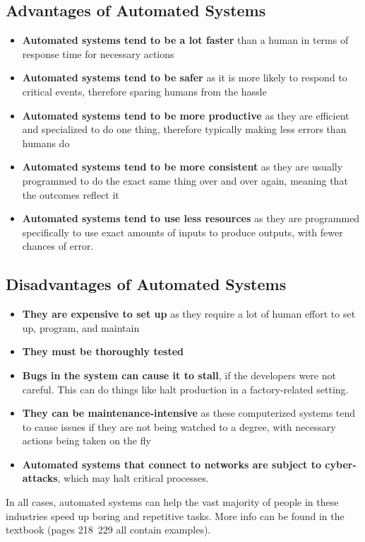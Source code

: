 \documentclass[../main.tex]{subfiles}
\begin{document}
\subsection{Advantages of Automated Systems}
\begin{itemize}
    \item \textbf{Automated systems tend to be a lot faster} than a human in terms of response time for necessary actions
    \item \textbf{Automated systems tend to be safer} as it is more likely to respond to critical events, therefore sparing humans from the hassle
    \item \textbf{Automated systems tend to be more productive} as they are efficient and specialized to do one thing, therefore typically making less errors than humans do
    \item \textbf{Automated systems tend to be more consistent} as they are usually programmed to do the exact same thing over and over again, meaning that the outcomes reflect it
    \item \textbf{Automated systems tend to use less resources} as they are programmed specifically to use exact amounts of inputs to produce outputs, with fewer chances of error.
\end{itemize}

\subsection{Disadvantages of Automated Systems}
\begin{itemize}
    \item \textbf{They are expensive to set up} as they require a lot of human effort to set up, program, and maintain
    \item \textbf{They must be thoroughly tested}
    \item \textbf{Bugs in the system can cause it to stall}, if the developers were not careful. This can do things like halt production in a factory-related setting. 
    \item \textbf{They can be maintenance-intensive} as these computerized systems tend to cause issues if they are not being watched to a degree, with necessary actions being taken on the fly
    \item \textbf{Automated systems that connect to networks are subject to cyber-attacks}, which may halt critical processes.
\end{itemize}

In all cases, automated systems can help the vast majority of people in these industries speed up boring and repetitive tasks. More info can be found in the textbook (pages 218~229 all contain examples).
\end{document}
